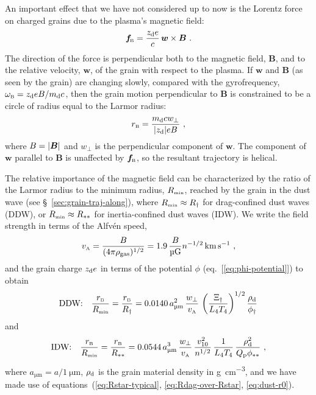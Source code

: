 An important effect that we have not considered up to now is the
Lorentz force on charged grains due to the plasma's magnetic field:
\begin{equation}
  \label{eq:f-lorentz}
  \bm{f}\!_{\scriptscriptstyle\text{B}} = \frac{z_{\text{d}} e}{c} \, \bm{w} \times \bm{B} \ . 
\end{equation}
The direction of the force is perpendicular both to the magnetic
field, \(\bm{B}\), and to the relative velocity, \(\bm{w}\), of the
grain with respect to the plasma.  If \(\bm{w}\) and \(\bm{B}\) (as
seen by the grain) are changing slowly, compared with the
gyrofrequency, \(\omega_{\scriptscriptstyle\text{B}} = z_{\text{d}} e B / m_{\text{d}} c\), then the grain
motion perpendicular to \(\bm{B}\) is constrained to be a circle of
radius equal to the Larmor radius:
\begin{equation}
  \label{eq:Larmor}
  r_{\scriptscriptstyle\text{B}} = \frac{m_{\text{d}} c w_\perp} {\lvert z_{\text{d}}\rvert e B} \ ,
\end{equation}
where \(B = \lvert\bm{B}\rvert\) and \(w_\perp\) is the perpendicular component
of \(\bm{w}\).  The component of \(\bm{w}\) parallel to \(\bm{B}\) is
unaffected by \(\bm{f}\!_{\scriptscriptstyle\text{B}}\), so the resultant trajectory is helical.

The relative importance of the magnetic field can be characterized by
the ratio of the Larmor radius to the minimum radius, \(R_{\scriptscriptstyle\text{min}}\),
reached by the grain in the dust wave (see
\S~\ref{sec:grain-traj-along}), where \(R_{\scriptscriptstyle\text{min}} \approx R_\dag\) for
drag-confined dust waves (DDW), or \(R_{\scriptscriptstyle\text{min}} \approx R_{**}\) for
inertia-confined dust waves (IDW).  We write the field strength in
terms of the Alfvén speed,
\begin{equation}
  \label{eq:alfven}
  v\alfven = \frac{B}{(4\pi\rho\gas)^{1/2}}
  = 1.9\, \frac{B}{\si{\micro G}} n^{-1/2} \, \si{km.s^{-1}} \ ,
\end{equation}
and the grain charge \(z_{\text{d}} e\) in terms of the potential \(\phi\) (eq.~[\ref{eq:phi-potential}]) to obtain
\begin{equation}
  \label{eq:larmor-over-Rdag}
  \text{DDW:}\quad \frac{r\B}{\Rmin} =  
  \frac{r\B}{R_\dag} = 0.0140 \,
  a_{\si{\um}}^2 \,
  \frac{w_\perp}{v\alfven} \,
  \left( \frac{\Xi_\dag}{L_4 T_4} \right)^{1/2}
  \frac{\rho\grain}{\phi_\dag}
\end{equation}
and
\begin{equation}
  \label{eq:larmor-over-Rstarstar}
  \text{IDW:}\quad \frac{r\B}{\Rmin} =  
  \frac{r\B}{R\starstar} = 0.0544 \,
  a_{\si{\um}}^3 \,
  \frac{w_\perp}{v\alfven} \,
  \frac{v_{10}^2 }{n^{1/2}} \,
  \frac{1}{L_4 T_4} \,
  \frac{\rho\grain^2}{\Qp \phi\starstar} \ ,
\end{equation}
where \(a_{\si{\um}} = a / \SI{1}{\um}\), \(\rho_{\text{d}}\) is the grain
material density in \si{g.cm^{-3}}, and we have made use of
equations~(\ref{eq:Rstar-typical}, \ref{eq:Rdag-over-Rstar},
\ref{eq:dust-r0}).

